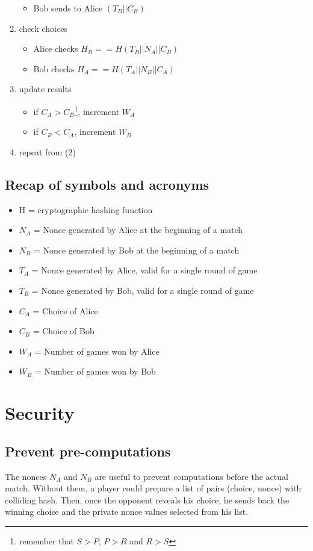 \documentclass[11 pt]{article}
\begin{document}
\begin{enumerate}
\begin{itemize}
		\item Bob sends to Alice $(T_B || C_B)$
	\end{itemize}
	\item check choices
	\begin{itemize}
		\item Alice checks $H_B == H( T_B || N_A || C_B )$
		\item Bob checks $H_A == H( T_A || N_B || C_A )$
	\end{itemize}
	\item update results
	\begin{itemize}
		\item if $C_A > C_B$\footnote{remember that $S > P$, $P > R$ and $R > S$}, increment $W_A$
		\item if $C_B < C_A$, increment $W_B$
	\end{itemize}
	\item repeat from (2)
\end{enumerate}

\subsection{Recap of symbols and acronyms}
\begin{itemize}
	\item H = cryptographic hashing function
	\item $N_A$ = Nonce generated by Alice at the beginning of a match
	\item $N_B$ = Nonce generated by Bob at the beginning of a match
	\item $T_A$ = Nonce generated by Alice, valid for a single round of game
	\item $T_B$ = Nonce generated by Bob, valid for a single round of game
	\item $C_A$ = Choice of Alice
	\item $C_B$ = Choice of Bob
	\item $W_A$ = Number of games won by Alice
	\item $W_B$ = Number of games won by Bob
\end{itemize}

\section{Security}
\subsection{Prevent pre-computations}
The nonces $N_A$ and $N_B$ are useful to prevent computations before the actual match. Without them, a player could prepare a list of pairs (choice, nonce) with colliding hash. Then, once the opponent reveals his choice, he sends back the winning choice and the private nonce values selected from his list.
\end{document}
